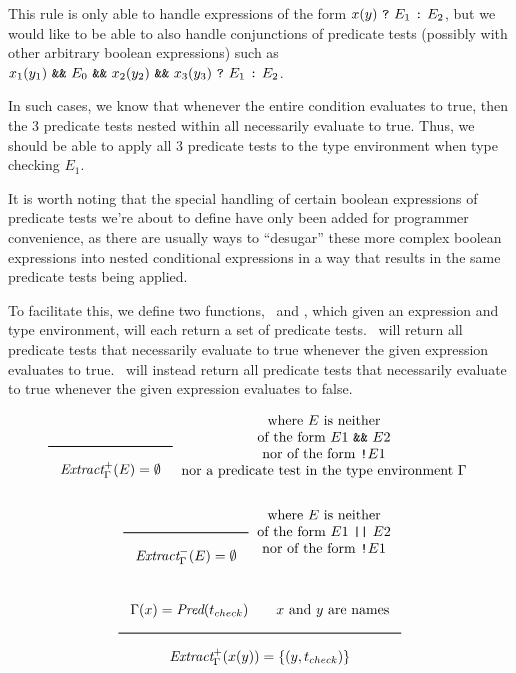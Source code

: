 This rule is only able to handle expressions of the form
$x(y)\ \texttt{?}\ E_1\ \texttt{:}\ E_2$,
but we would like to be able to also handle
conjunctions of predicate tests
(possibly with other arbitrary boolean expressions)
such as
$x_1(y_1)\ \AndOp\ E_0\ \AndOp\ x_2(y_2)\ \AndOp\ x_3(y_3)\ \ThenOp\ E_1\ \ElseOp\ E_2$.

In such cases, we know that whenever the entire condition evaluates to true,
then the 3 predicate tests nested within all necessarily evaluate to true.
Thus, we should be able to apply all 3 predicate tests to the type environment
when type checking $E_1$.

It is worth noting that the special handling of
certain boolean expressions of predicate tests
we're about to define
have only been added for programmer convenience,
as there are usually ways to ``desugar''
these more complex boolean expressions into nested conditional expressions
in a way that results in the same predicate tests being applied.

To facilitate this, we define two functions,
\ExtractPos\ and \ExtractNeg,
which given an expression and type environment,
will each return a set of predicate tests.
\ExtractPos\ will return all predicate tests that necessarily evaluate to true
whenever the given expression evaluates to true.
\ExtractNeg\ will instead return all predicate tests that necessarily evaluate to true
whenever the given expression evaluates to false.

\[
\Rule
{}
{\ExtractPos_\Gamma(E) = \emptyset}
\begin{array}{c}
\text{where $E$ is neither} \\
\text{of the form $E1$ \AndOp\ $E2$} \\
\text{nor of the form \texttt{!}$E1$} \\
\text{nor a predicate test in the type environment $\Gamma$}
\end{array}
\]

\[
\Rule
{}
{\ExtractNeg_\Gamma(E) = \emptyset}
\begin{array}{c}
\text{where $E$ is neither} \\
\text{of the form $E1$ \OrOp\ $E2$} \\
\text{nor of the form \texttt{!}$E1$} \\
\end{array}
\]

\[
\Rule
{\Gamma(x) = \Pred(t_{check}) \qquad x \text{ and } y \text{ are names}}
{\ExtractPos_\Gamma(x(y)) = \{(y, t_{check})\}}
\]

